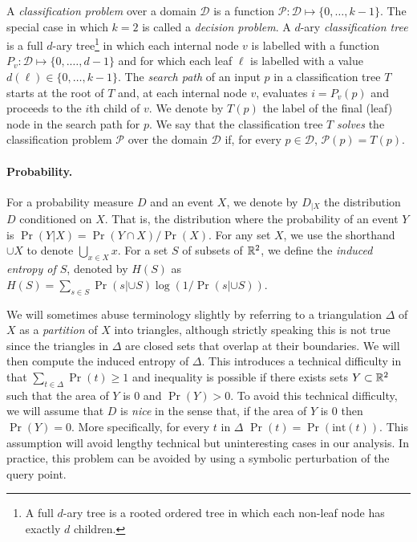 \documentclass[lotsofwhite]{patmorin}
\newcommand{\interior}{\mathrm{int}}
\begin{document}
A \emph{classification problem} over a domain $\mathcal{D}$ is a
function $\mathcal{P}:\mathcal{D}\mapsto \{0,\ldots,k-1\}$.  The
special case in which $k=2$ is called a \emph{decision problem}.  A
$d$-ary \emph{classification tree} is a full $d$-ary tree\footnote{A
full $d$-ary tree is a rooted ordered tree in which each non-leaf node
has exactly $d$ children.} in which each internal node $v$ is labelled
with a function $P_v:\mathcal{D}\mapsto\{0,.\ldots,d-1\}$ and for
which each leaf $\ell$ is labelled with a value
$d(\ell)\in\{0,\ldots,k-1\}$. The \emph{search path} of an input $p$
in a classification tree $T$ starts at the root of $T$ and, at each
internal node $v$, evaluates $i=P_v(p)$ and proceeds to the $i$th
child of $v$.  We denote by $T(p)$ the label of the final (leaf) node
in the search path for $p$.  We say that the classification tree $T$
\emph{solves} the classification problem $\mathcal{P}$ over the domain
$\mathcal{D}$ if, for every $p\in \mathcal{D}$, $\mathcal{P}(p)=T(p)$.

\paragraph{Probability.}

For a probability measure $D$ and an event $X$, we denote by $D_{|X}$ the
distribution $D$ conditioned on $X$.  That is, the distribution where
the probability of an event $Y$ is $\Pr(Y|X)=\Pr(Y\cap X)/\Pr(X)$.
For any set $X$, we use the shorthand $\cup X$ to denote
$\bigcup_{x\in X} x$.  For a set $S$ of subsets of $\mathbb{R}^2$, we define
the \emph{induced entropy of $S$}, denoted by $H(S)$ as
$H(S)=\sum_{s\in S}\Pr(s|{\cup S})\log(1/\Pr(s|{\cup S}))$.

We will sometimes abuse terminology slightly by referring to a
triangulation $\Delta$ of $X$ as a \emph{partition} of $X$ into
triangles, although strictly speaking this is not true since the
triangles in $\Delta$ are closed sets that overlap at their
boundaries.  We will then compute the induced entropy of $\Delta$.
This introduces a technical difficulty in that
$\sum_{t\in\Delta}\Pr(t)\ge 1$ and inequality is possible if there
exists sets $Y\subset \mathbb{R}^2$ such that the area of $Y$ is 0 and
$\Pr(Y)>0$.  To avoid this technical difficulty, we will assume that
$D$ is \emph{nice} in the sense that, if the area of $Y$ is 0 then
$\Pr(Y)=0$.   More specifically, for every $t$ in $\Delta$ $\Pr(t) =
\Pr(\interior(t))$.  This assumption will avoid lengthy technical but
uninteresting cases in our analysis.  In practice, this problem can
be avoided by using a symbolic perturbation of the query point.
\end{document}
